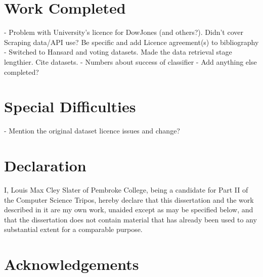 \documentclass[12pt,a4paper,twoside,openright]{report}
\begin{document}
\section*{Work Completed}
 - Problem with University's licence for DowJones (and others?). Didn't cover Scraping data/API use? Be specific and add Licence agreement(s) to bibliography
 - Switched to Hansard and voting datasets. Made the data retrieval stage lengthier. Cite datasets.
 - Numbers about success of classifier
 - Add anything else completed?


\section*{Special Difficulties}
 - Mention the original dataset licence issues and change?
 
\newpage
\section*{Declaration}

I, Louis Max Cley Slater of Pembroke College, being a candidate for Part II of the Computer Science Tripos, hereby declare that this dissertation and the work described in it are my own work, unaided except as may be specified below, and that the dissertation does not contain material that has already been used to any substantial extent for a comparable purpose.

\bigskip
{}

\medskip
{}

\setcounter{tocdepth}{4}
\tableofcontents

\listoffigures

\newpage
\section*{Acknowledgements}





\pagestyle{headings}
\end{document}
